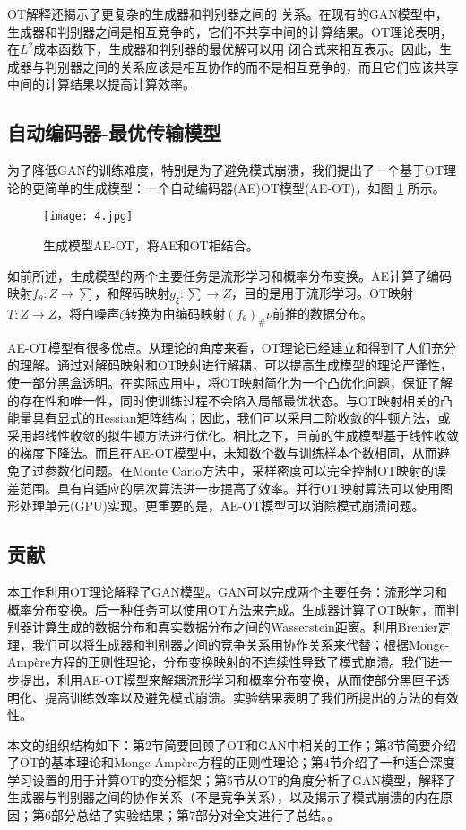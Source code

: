 OT解释还揭示了更复杂的生成器和判别器之间的
关系。在现有的GAN模型中，生成器和判别器之间是相互竞争的，它们不共享中间的计算结果。OT理论表明，在$L^2$成本函数下，生成器和判别器的最优解可以用
闭合式来相互表示。因此，生成器与判别器之间的关系应该是相互协作的而不是相互竞争的，而且它们应该共享中间的计算结果以提高计算效率。

\subsection{自动编码器-最优传输模型}

为了降低GAN的训练难度，特别是为了避免模式崩溃，我们提出了一个基于OT理论的更简单的生成模型：一个自动编码器(AE)OT模型(AE-OT)，如图 \ref{fig:4} 所示。

\begin{figure}[h]
	\centering
	\texttt{[image: 4.jpg]}
	\caption{生成模型AE-OT，将AE和OT相结合。
	}
	\label{fig:4}
\end{figure}

如前所述，生成模型的两个主要任务是流形学习和概率分布变换。AE计算了编码映射$f_{\theta}:Z \to \sum$，和解码映射$g_{\xi}: \sum \to Z$，目的是用于流形学习。OT映射$T:Z \to Z$，将白噪声$\zeta$转换为由编码映射$(f_{\theta})_{\#}\nu$前推的数据分布。

AE-OT模型有很多优点。从理论的角度来看，OT理论已经建立和得到了人们充分的理解。通过对解码映射和OT映射进行解耦，可以提高生成模型的理论严谨性，使一部分黑盒透明。在实际应用中，将OT映射简化为一个凸优化问题，保证了解的存在性和唯一性，同时使训练过程不会陷入局部最优状态。与OT映射相关的凸能量具有显式的Hessian矩阵结构；因此，我们可以采用二阶收敛的牛顿方法，或采用超线性收敛的拟牛顿方法进行优化。相比之下，目前的生成模型基于线性收敛的梯度下降法。而且在AE-OT模型中，未知数个数与训练样本个数相同，从而避免了过参数化问题。在Monte Carlo方法中，采样密度可以完全控制OT映射的误差范围。具有自适应的层次算法进一步提高了效率。并行OT映射算法可以使用图形处理单元(GPU)实现。更重要的是，AE-OT模型可以消除模式崩溃问题。

\subsection{贡献}

本工作利用OT理论解释了GAN模型。GAN可以完成两个主要任务：流形学习和概率分布变换。后一种任务可以使用OT方法来完成。生成器计算了OT映射，而判别器计算生成的数据分布和真实数据分布之间的Wasserstein距离。利用Brenier定理，我们可以将生成器和判别器之间的竞争关系用协作关系来代替；根据Monge-Ampère方程的正则性理论，分布变换映射的不连续性导致了模式崩溃。我们进一步提出，利用AE-OT模型来解耦流形学习和概率分布变换，从而使部分黑匣子透明化、提高训练效率以及避免模式崩溃。实验结果表明了我们所提出的方法的有效性。

本文的组织结构如下：第2节简要回顾了OT和GAN中相关的工作；第3节简要介绍了OT的基本理论和Monge-Ampère方程的正则性理论；第4节介绍了一种适合深度学习设置的用于计算OT的变分框架；第5节从OT的角度分析了GAN模型，解释了生成器与判别器之间的协作关系（不是竞争关系），以及揭示了模式崩溃的内在原因；第6部分总结了实验结果；第7部分对全文进行了总结。。